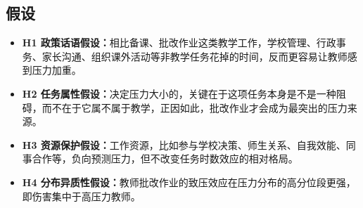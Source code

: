 \documentclass[zihao = -4, linespread = 1.5]{article}
\begin{document}
\subsection{假设}
\begin{itemize}
    \item[$\divideontimes$] \textbf{H1 政策话语假设：}相比备课、批改作业这类教学工作，学校管理、行政事务、家长沟通、组织课外活动等非教学任务花掉的时间，反而更容易让教师感到压力加重。
    \item[$\divideontimes$] \textbf{H2 任务属性假设：}决定压力大小的，关键在于这项任务本身是不是一种阻碍，而不在于它属不属于教学，正因如此，批改作业才会成为最突出的压力来源。
    \item[$\divideontimes$] \textbf{H3 资源保护假设：}工作资源，比如参与学校决策、师生关系、自我效能、同事合作等，负向预测压力，但不改变任务时数效应的相对格局。
    \item[$\divideontimes$] \textbf{H4 分布异质性假设：}教师批改作业的致压效应在压力分布的高分位段更强，即伤害集中于高压力教师。
\end{itemize}
\end{document}
